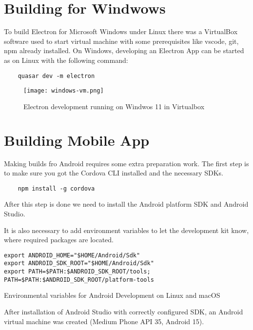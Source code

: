 \section{{Building for Windwows}}%
\label{sec:windows}

To build Electron for Microsoft Windows under Linux there was a VirtualBox \autocite{VBox} software used to start virtual machine with some prerequisites like vscode, git, npm already installed. On Windows, developing an Electron App can be started as on Linux with the following command:

\begin{verbatim}
    quasar dev -m electron
\end{verbatim}


\begin{figure}[H]
    \centering
    \texttt{[image: windows-vm.png]}
    \caption[Electron on Windows virtual machine]{\label{fig:windowsvbox} Electron development running on Windwos 11 in Virtualbox }
\end{figure}


\section{{Building Mobile App}}%
\label{sec:mobile}

Making builds fro Android requires some extra preparation work. The first step is to make sure you got the Cordova CLI installed and the necessary SDKs.
\begin{verbatim}
    npm install -g cordova
\end{verbatim}

After this step is done we need to install the Android platform SDK and Android Studio.  

It is also necessary to add environment variables to let the development kit know, where required packages are located.

\begin{listing}[H]
    \begin{verbatim}
export ANDROID_HOME="$HOME/Android/Sdk"
export ANDROID_SDK_ROOT="$HOME/Android/Sdk"
export PATH=$PATH:$ANDROID_SDK_ROOT/tools; PATH=$PATH:$ANDROID_SDK_ROOT/platform-tools
    \end{verbatim}
\caption[Environmental variables for Android SDK on Linux and macOS]{Environmental variables for Android Development on Linux and macOS}
\end{listing}

After installation of Android Studio with correctly configured SDK, an Android virtual machine was created (Medium Phone API 35, Android 15).

